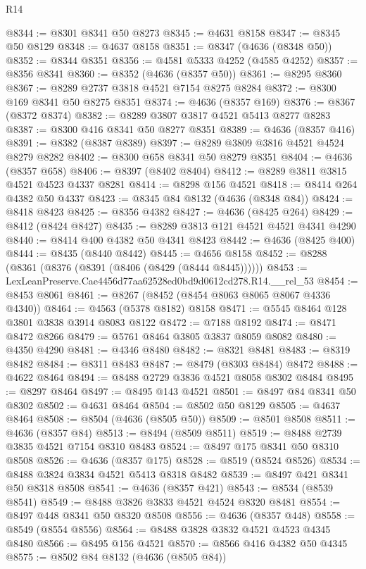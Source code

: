 \begin{lexlean}{R14}
\begin{coremodule}
@8344 := @8301 @8341 @50 @8273
@8345 := @4631 @8158
@8347 := @8345 @50 @8129
@8348 := @4637 @8158
@8351 := @8347 (@4636 (@8348 @50))
@8352 := @8344 @8351
@8356 := @4581 @5333 @4252 (@4585 @4252)
@8357 := @8356 @8341
@8360 := @8352 (@4636 (@8357 @50))
@8361 := @8295 @8360
@8367 := @8289 @2737 @3818 @4521 @7154 @8275 @8284
@8372 := @8300 @169 @8341 @50 @8275 @8351
@8374 := @4636 (@8357 @169)
@8376 := @8367 (@8372 @8374)
@8382 := @8289 @3807 @3817 @4521 @5413 @8277 @8283
@8387 := @8300 @416 @8341 @50 @8277 @8351
@8389 := @4636 (@8357 @416)
@8391 := @8382 (@8387 @8389)
@8397 := @8289 @3809 @3816 @4521 @4524 @8279 @8282
@8402 := @8300 @658 @8341 @50 @8279 @8351
@8404 := @4636 (@8357 @658)
@8406 := @8397 (@8402 @8404)
@8412 := @8289 @3811 @3815 @4521 @4523 @4337 @8281
@8414 := @8298 @156 @4521
@8418 := @8414 @264 @4382 @50 @4337
@8423 := @8345 @84 @8132 (@4636 (@8348 @84))
@8424 := @8418 @8423
@8425 := @8356 @4382
@8427 := @4636 (@8425 @264)
@8429 := @8412 (@8424 @8427)
@8435 := @8289 @3813 @121 @4521 @4521 @4341 @4290
@8440 := @8414 @400 @4382 @50 @4341 @8423
@8442 := @4636 (@8425 @400)
@8444 := @8435 (@8440 @8442)
@8445 := @4656 @8158
@8452 := @8288 (@8361 (@8376 (@8391 (@8406 (@8429 (@8444 @8445))))))
@8453 := LexLeanPreserve.Cae4456d77aa62528ed0bd9d0612cd278.R14.__rel_53
@8454 := @8453 @8061
@8461 := @8267 (@8452 (@8454 @8063 @8065 @8067 @4336 @4340))
@8464 := @4563 (@5378 @8182) @8158
@8471 := @5545 @8464 @128 @3801 @3838 @3914 @8083 @8122
@8472 := @7188 @8192
@8474 := @8471 @8472 @8266
@8479 := @5761 @8464 @3805 @3837 @8059 @8082
@8480 := @4350 @4290
@8481 := @4346 @8480
@8482 := @8321 @8481
@8483 := @8319 @8482
@8484 := @8311 @8483
@8487 := @8479 (@8303 @8484) @8472
@8488 := @4622 @8464
@8494 := @8488 @2729 @3836 @4521 @8058 @8302 @8484
@8495 := @8297 @8464
@8497 := @8495 @143 @4521
@8501 := @8497 @84 @8341 @50 @8302
@8502 := @4631 @8464
@8504 := @8502 @50 @8129
@8505 := @4637 @8464
@8508 := @8504 (@4636 (@8505 @50))
@8509 := @8501 @8508
@8511 := @4636 (@8357 @84)
@8513 := @8494 (@8509 @8511)
@8519 := @8488 @2739 @3835 @4521 @7154 @8310 @8483
@8524 := @8497 @175 @8341 @50 @8310 @8508
@8526 := @4636 (@8357 @175)
@8528 := @8519 (@8524 @8526)
@8534 := @8488 @3824 @3834 @4521 @5413 @8318 @8482
@8539 := @8497 @421 @8341 @50 @8318 @8508
@8541 := @4636 (@8357 @421)
@8543 := @8534 (@8539 @8541)
@8549 := @8488 @3826 @3833 @4521 @4524 @8320 @8481
@8554 := @8497 @448 @8341 @50 @8320 @8508
@8556 := @4636 (@8357 @448)
@8558 := @8549 (@8554 @8556)
@8564 := @8488 @3828 @3832 @4521 @4523 @4345 @8480
@8566 := @8495 @156 @4521
@8570 := @8566 @416 @4382 @50 @4345
@8575 := @8502 @84 @8132 (@4636 (@8505 @84))

\end{coremodule}
\end{lexlean}
